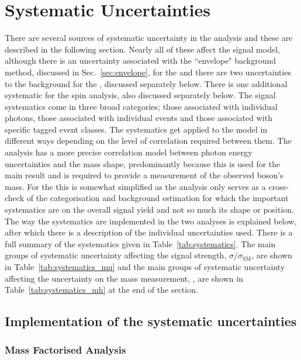 \section{Systematic Uncertainties}
\label{sec:systematics}

There are several sources of systematic uncertainty in the analysis and these are described in the following section. Nearly all of these affect the signal model, although there is an uncertainty associated with the ``envelope" background method, discussed in Sec.~\ref{sec:envelope}, for the \MFM and there are two uncertainties to the background for the \SMVA, discussed separately below. There is one additional systematic for the spin analysis, also discussed separately below. The signal systematics come in three broad categories; those associated with individual photons, those associated with individual events and those associated with specific tagged event classes. The systematics get applied to the model in different ways depending on the level of correlation required between them. The \MFM analysis has a more precise correlation model between photon energy uncertainties and the mass shape, predominantly because this is used for the main result and is required to provide a measurement of the observed boson's mass. For the \SMVA this is somewhat simplified as the analysis only serves as a cross-check of the categorisation and background estimation for which the important systematics are on the overall signal yield and not so much its shape or position. The way the systematics are implemented in the two analyses is explained below, after which there is a description of the individual uncertainties used. There is a full summary of the systematics given in Table~\ref{tab:systematics}. The main groups of systematic uncertainty affecting the signal strength, $\sigma/\sigma_{\mathrm{SM}}$, are shown in Table~\ref{tab:systematics_mu} and the main groups of systematic uncertainty affecting the uncertainty on the mass measurement, \mH, are shown in Table~\ref{tab:systematics_mh} at the end of the section.

\subsection{Implementation of the systematic uncertainties}

\subsubsection{Mass Factorised Analysis}

